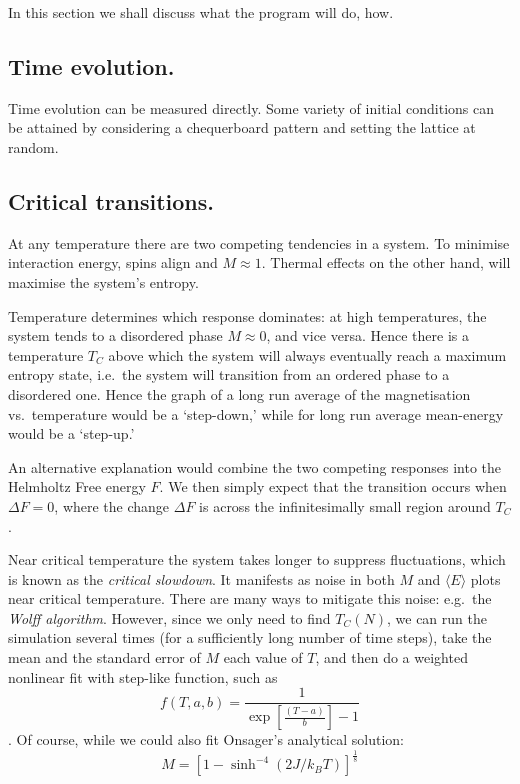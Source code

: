 \documentclass[12pt]{article}
\begin{document}
In this section we shall discuss what the program will do, how. 

\subsection{Time evolution.}\label{sec:time_evolution}

Time evolution can be measured directly. Some variety of initial conditions can be attained by considering a chequerboard pattern and setting the lattice at random. 

\subsection{Critical transitions.}

At any temperature there are two competing tendencies in a system. To minimise interaction energy, spins align and \(M\approx1\). Thermal effects on the other hand, will maximise the system's entropy.

Temperature determines which response dominates: at high temperatures, the system tends to a disordered phase \(M\approx 0\), and vice versa. Hence there is a temperature \(T_C\) above which the system will always eventually reach a maximum entropy state, i.e.~the system will transition from an ordered phase to a disordered one. Hence the graph of a long run average of the magnetisation vs.~temperature would be a `step-down,' while for long run average mean-energy would be a `step-up.'

An alternative explanation would combine the two competing responses into the Helmholtz Free energy \(F\). We then simply expect that the transition occurs when \(\Delta F = 0\), where the change \(\Delta F\) is across the infinitesimally small region around \(T_C\).\cite{Schwabl}

Near critical temperature the system takes longer to suppress fluctuations, which is known as the \emph{critical slowdown}\cite{Wolff}. It manifests as noise in both \(M\) and \(\langle  E \rangle\) plots near critical temperature. There are many ways to mitigate this noise: e.g.~the \emph{ Wolff algorithm}\cite{Wolff}. However, since we only need to find \(T_C(N)\), we can run the simulation several times (for a sufficiently long number of time steps), take the mean and the standard error of \(M\) each value of \(T\), and then do a weighted nonlinear fit with step-like function, such as \[  f(T, a, b) = \frac{1}{\exp\left[  \frac{(T-a)}{b} \right] -1 }\]. Of course, while we could also fit Onsager's analytical solution: 
\begin{equation}\label{eq:analytical_magnetisaion}
  M = {[1 - \sinh^{-4} ( 2  J/ k_B T)]}^\frac{1}{8}
\end{equation}
\end{document}

